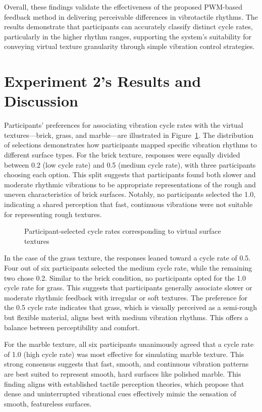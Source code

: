 Overall, these findings validate the effectiveness of the proposed PWM-based feedback method in delivering perceivable differences in vibrotactile rhythms. The results demonstrate that participants can accurately classify distinct cycle rates, particularly in the higher rhythm ranges, supporting the system’s suitability for conveying virtual texture granularity through simple vibration control strategies.

\section{Experiment 2's Results and Discussion}
Participants' preferences for associating vibration cycle rates with the virtual textures—brick, grass, and marble—are illustrated in Figure~\ref{fig:ex2_results}. The distribution of selections demonstrates how participants mapped specific vibration rhythms to different surface types. For the brick texture, responses were equally divided between 0.2 (low cycle rate) and 0.5 (medium cycle rate), with three participants choosing each option. This split suggests that participants found both slower and moderate rhythmic vibrations to be appropriate representations of the rough and uneven characteristics of brick surfaces. Notably, no participants selected the 1.0, indicating a shared perception that fast, continuous vibrations were not suitable for representing rough textures.

\begin{figure}[H]\centering
	
	\caption{Participant-selected cycle rates corresponding to virtual surface textures}\label{fig:ex2_results}
\end{figure}

In the case of the grass texture, the responses leaned toward a cycle rate of 0.5. Four out of six participants selected the medium cycle rate, while the remaining two chose 0.2. Similar to the brick condition, no participants opted for the 1.0 cycle rate for grass. This suggests that participants generally associate slower or moderate rhythmic feedback with irregular or soft textures. The preference for the 0.5 cycle rate indicates that grass, which is visually perceived as a semi-rough but flexible material, aligns best with medium vibration rhythms. This offers a balance between perceptibility and comfort.

For the marble texture, all six participants unanimously agreed that a cycle rate of 1.0 (high cycle rate) was most effective for simulating marble texture. This strong consensus suggests that fast, smooth, and continuous vibration patterns are best suited to represent smooth, hard surfaces like polished marble. This finding aligns with established tactile perception theories, which propose that dense and uninterrupted vibrational cues effectively mimic the sensation of smooth, featureless surfaces.


